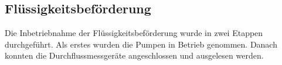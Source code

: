 \subsection{Flüssigkeitsbeförderung}
\label{subsec:Inbetriebnahme_Flüssigkeitsbeförderung}

Die Inbetriebnahme der Flüssigkeitsbeförderung wurde in zwei Etappen durchgeführt. Als erstes wurden die Pumpen in Betrieb genommen. Danach konnten die Durchflussmessgeräte angeschlossen und ausgelesen werden. 